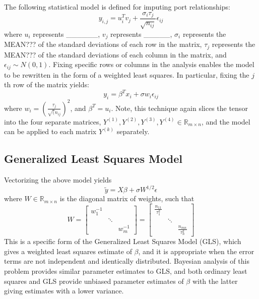 \documentclass[12pt,twoside]{dukestatscithesis}
\theoremstyle{definition}
\theoremstyle{definition}
\theoremstyle{definition}
\theoremstyle{remark}
\begin{document}
The following statistical model is defined for imputing port
relationships:
\[y_{i,j} = u_i^Tv_j + \frac{\sigma_i \tau_j}{\sqrt{n_{ij}}}\epsilon_{ij}\]
where \(u_i\) represents \_\_\_\_\_\_, \(v_j\) represents \_\_\_\_\_,
\(\sigma_i\) represents the MEAN??? of the standard deviations of each
row in the matrix, \(\tau_j\) represents the MEAN??? of the standard
deviations of each column in the matrix, and
\(\epsilon_{ij} \sim N(0,1)\). Fixing specific rows or columns in the
analysis enables the model to be rewritten in the form of a weighted
least squares. In particular, fixing the \(j\)th row of the matrix
yields: \[y_i = \beta^Tx_i + \sigma w_i\epsilon_{ij}\] where
\(w_i = (\frac{\tau_j}{\sqrt(n_{ij}})^2\), and \(\beta^T = u_i\). Note,
this technique again slices the tensor into the four separate matrices,
\(Y^{(1)}, Y^{(2)}, Y^{(3)}, Y^{(4)} \in \mathbb{R}_{m \times n}\), and
the model can be applied to each matrix \(Y^{(k)}\) separately.

\subsection{Generalized Least Squares
Model}\label{generalized-least-squares-model}

Vectorizing the above model yields
\[\tilde{y} = X\beta + \sigma W^{1/2} \epsilon\] where
\(W \in \mathbb{R}_{m \times n}\) is the diagonal matrix of weights,
such that \[
  W =
  \begin{bmatrix}
    w^{-1}_{1} & & \\
    & \ddots & \\
    & & w^{-1}_{m}
  \end{bmatrix} 
  = \begin{bmatrix}
    \frac{n_{11}}{\tau_1^2} & & \\
    & \ddots & \\
    & & \frac{n_{mn}}{\tau_n^2}
  \end{bmatrix}\]
This is a specific form of the Generalized Least Squares Model (GLS),
which gives a weighted least squares estimate of \(\beta\), and it is
appropriate when the error terms are not independent and identically
distributed. Bayesian analysis of this problem provides similar
parameter estimates to GLS, and both ordinary least squares and GLS
provide unbiased parameter estimates of \(\beta\) with the latter giving
estimates with a lower variance.
\end{document}
